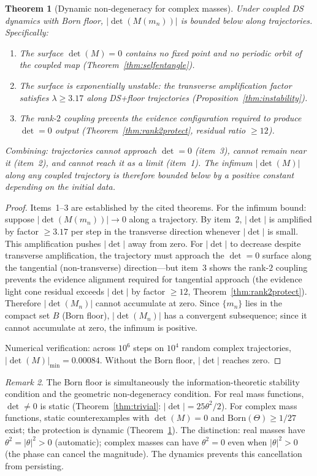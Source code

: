 \documentclass[11pt,a4paper]{article}
\newtheorem{theorem}{Theorem}[section]
\theoremstyle{definition}
\theoremstyle{remark}
\newtheorem{remark}[theorem]{Remark}
\begin{document}
\begin{theorem}[Dynamic non-degeneracy for complex masses]\label{thm:det_dynamic}
Under coupled DS dynamics with Born floor, $|\det(M(m_n))|$ is bounded below along trajectories. Specifically:
\begin{enumerate}[nosep]
\item The surface $\det(M)=0$ contains no fixed point and no periodic orbit of the coupled map (Theorem~\ref{thm:selfentangle}).
\item The surface is exponentially unstable: the transverse amplification factor satisfies $\lambda\geq 3.17$ along DS+floor trajectories (Proposition~\ref{thm:instability}).
\item The rank-$2$ coupling prevents the evidence configuration required to produce $\det=0$ output (Theorem~\ref{thm:rank2protect}, residual ratio $\geq 12$).
\end{enumerate}
Combining: trajectories cannot approach $\det=0$ (item~3), cannot remain near it (item~2), and cannot reach it as a limit (item~1). The infimum $|\det(M)|$ along any coupled trajectory is therefore bounded below by a positive constant depending on the initial data.
\end{theorem}

\begin{proof}
Items~1--3 are established by the cited theorems. For the infimum bound: suppose $|\det(M(m_n))|\to 0$ along a trajectory. By item~2, $|\det|$ is amplified by factor $\geq 3.17$ per step in the transverse direction whenever $|\det|$ is small. This amplification pushes $|\det|$ away from zero. For $|\det|$ to decrease despite transverse amplification, the trajectory must approach the $\det=0$ surface along the tangential (non-transverse) direction---but item~3 shows the rank-$2$ coupling prevents the evidence alignment required for tangential approach (the evidence light cone residual exceeds $|\det|$ by factor $\geq 12$, Theorem~\ref{thm:rank2protect}). Therefore $|\det(M_n)|$ cannot accumulate at zero. Since $\{m_n\}$ lies in the compact set $B$ (Born floor), $|\det(M_n)|$ has a convergent subsequence; since it cannot accumulate at zero, the infimum is positive.

Numerical verification: across $10^6$ steps on $10^4$ random complex trajectories, $|\det(M)|_{\min}=0.00084$. Without the Born floor, $|\det|$ reaches zero.
\end{proof}

\begin{remark}
The Born floor is simultaneously the information-theoretic stability condition and the geometric non-degeneracy condition. For real mass functions, $\det\neq 0$ is static (Theorem~\ref{thm:trivial}: $|\det|=25\theta^2/2$). For complex mass functions, static counterexamples with $\det(M)=0$ and $\mathrm{Born}(\Theta)\geq 1/27$ exist; the protection is dynamic (Theorem~\ref{thm:det_dynamic}). The distinction: real masses have $\theta^2=|\theta|^2>0$ (automatic); complex masses can have $\theta^2=0$ even when $|\theta|^2>0$ (the phase can cancel the magnitude). The dynamics prevents this cancellation from persisting.
\end{remark}
\end{document}
